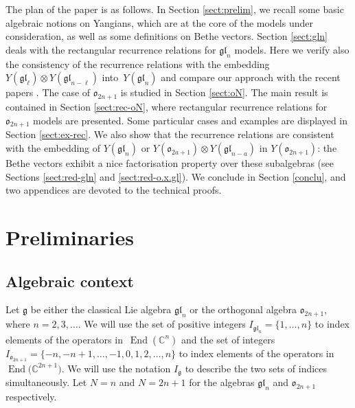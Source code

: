 \documentclass[10pt,a4paper]{amsart}
\theoremstyle{definition}
\def\CC{{\mathbb{C}}}
\def\Ig{I_{\mathfrak{g}}}
\begin{document}
The plan of the paper is as follows. In Section \ref{sect:prelim}, we recall some basic algebraic notions
on Yangians, which are at the core of the models under consideration, as well as some definitions on Bethe vectors.
Section \ref{sect:gln} deals with the rectangular recurrence relations for $\mathfrak{gl}_n$ models. Here we verify also the consistency of the recurrence
relations with the embedding $Y(\mathfrak{gl}_{\ell})\otimes
Y(\mathfrak{gl}_{n-\ell})$ into~$Y(\mathfrak{gl}_{n})$ and compare our approach with
the recent papers \cite{KT1,KT2}.
The case of $\mathfrak{o}_{2n+1}$ is studied in Section \ref{sect:oN}. The main result is contained in Section \ref{sect:rec-oN}, where
rectangular recurrence relations for $\mathfrak{o}_{2n+1}$ models are presented.
Some particular cases and examples are displayed in Section \ref{sect:ex-rec}.
We also show that the recurrence relations are consistent with the embedding of $Y(\mathfrak{gl}_n)$
or $Y(\mathfrak{o}_{2a+1})\otimes Y(\mathfrak{gl}_{n-a})$ in
$Y(\mathfrak{o}_{2n+1})$: the Bethe vectors exhibit a nice factorisation property over these subalgebras (see Sections
\ref{sect:red-gln} and \ref{sect:red-o.x.gl}). We conclude in Section \ref{conclu}, and two appendices are devoted to the technical proofs.

\section{Preliminaries\label{sect:prelim}}

\subsection{Algebraic context}
Let $\mathfrak{g}$ be either the classical Lie algebra $\mathfrak{gl}_n$ or the
orthogonal algebra $\mathfrak{o}_{2n+1}$,
where $n=2,3,\dots$.
We will use the set of positive integers
$I_{\mathfrak{gl}_n}=\{1,\dots,n\}$ to index elements of the operators in~$\operatorname{End}({\CC}^{n})$ and the set of integers
$I_{\mathfrak{o}_{2n+1}}=\{-n,-n+1,\dots,-1,0,1,2,\dots,n\}$
to index elements of the operators in $\operatorname{ End}\bigl({\CC}^{2n+1}\bigr)$.
 We will use the notation $\Ig$ to describe the two sets of indices simultaneously.
Let $N=n$ and $N=2n+1$ for the algebras $\mathfrak{gl}_n$ and $\mathfrak{o}_{2n+1}$
respectively.
%
\end{document}
